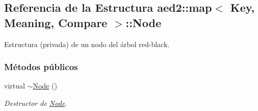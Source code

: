 \hypertarget{structaed2_1_1map_1_1Node}{\subsection{Referencia de la Estructura aed2\-:\-:map$<$ Key, Meaning, Compare $>$\-:\-:Node}
\label{structaed2_1_1map_1_1Node}
}


Estructura (privada) de un nodo del árbol red-\/black.  


\subsubsection*{Métodos públicos}
\begin{DoxyCompactItemize}
\item 
virtual \hyperlink{structaed2_1_1map_1_1Node_a4f3cb2cc4302fe96432e624ced147540_a4f3cb2cc4302fe96432e624ced147540}{$\sim$\-Node} ()
\begin{DoxyCompactList}\small\item\em Destructor de \hyperlink{structaed2_1_1map_1_1Node}{Node}. \end{DoxyCompactList}\end{DoxyCompactItemize}
